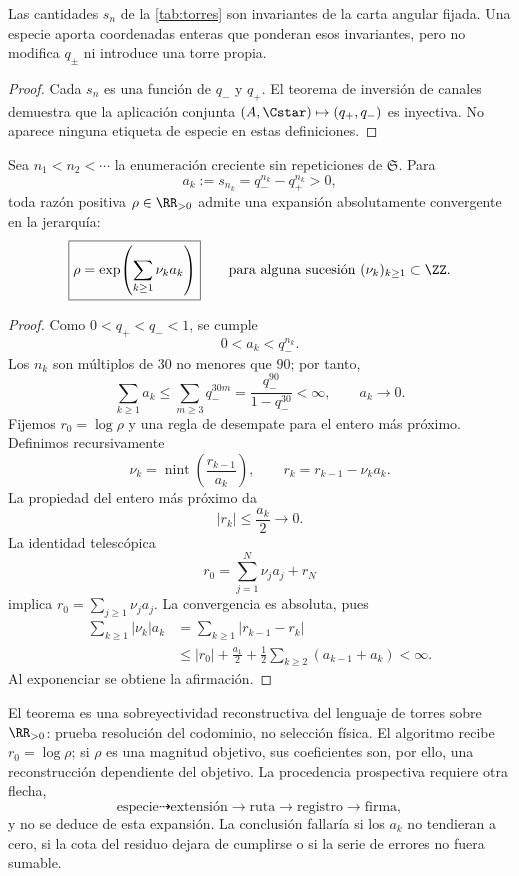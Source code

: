 \begin{proposition}
Las cantidades \(s_n\) de la \cref{tab:torres} son invariantes de la carta
angular fijada. Una especie aporta coordenadas enteras que ponderan esos
invariantes, pero no modifica \(q_\pm\) ni introduce una torre propia.
\end{proposition}
\begin{proof}
Cada \(s_n\) es una función de \(q_-\) y \(q_+\). El teorema de inversión de
canales demuestra que la aplicación conjunta
\((A,\Cstar)\mapsto(q_+,q_-)\) es inyectiva. No aparece ninguna etiqueta de
especie en estas definiciones.
\end{proof}

\begin{theorem}
\label{thm:completitud-reconstructiva-torres}
Sea \(n_1<n_2<\cdots\) la enumeración creciente sin repeticiones de
\(\mathfrak S\). Para
\[
 a_k:=s_{n_k}=q_-^{n_k}-q_+^{n_k}>0,
\]
toda razón positiva \(\rho\in\RR_{>0}\) admite una expansión absolutamente
convergente en la jerarquía:
\[
 \boxed{\rho=
 \exp\!\left(\sum_{k\geq1}\nu_k a_k\right)}
 \qquad\text{para alguna sucesión }(\nu_k)_{k\geq1}\subset\ZZ.
\]
\end{theorem}

\begin{proof}
Como \(0<q_+<q_-<1\), se cumple
\[
 0<a_k<q_-^{n_k}.
\]
Los \(n_k\) son múltiplos de \(30\) no menores que \(90\); por tanto,
\[
 \sum_{k\geq1}a_k
 \leq\sum_{m\geq3}q_-^{30m}
 =\frac{q_-^{90}}{1-q_-^{30}}<\infty,
 \qquad a_k\longrightarrow0.
\]
Fijemos \(r_0=\log\rho\) y una regla de desempate para el entero más próximo.
Definimos recursivamente
\[
 \nu_k=\operatorname{nint}\!\left(\frac{r_{k-1}}{a_k}\right),
 \qquad
 r_k=r_{k-1}-\nu_k a_k.
\]
La propiedad del entero más próximo da
\[
 |r_k|\leq\frac{a_k}{2}\longrightarrow0.
\]
La identidad telescópica
\[
 r_0=\sum_{j=1}^{N}\nu_j a_j+r_N
\]
implica \(r_0=\sum_{j\geq1}\nu_j a_j\). La convergencia es absoluta, pues
\[
 \begin{aligned}
 \sum_{k\geq1}|\nu_k|a_k
 &=\sum_{k\geq1}|r_{k-1}-r_k|\\
 &\leq |r_0|+\frac{a_1}{2}
 +\frac12\sum_{k\geq2}(a_{k-1}+a_k)<\infty.
 \end{aligned}
\]
Al exponenciar se obtiene la afirmación.
\end{proof}

\begin{remark}
El teorema es una sobreyectividad reconstructiva del lenguaje de torres sobre
\(\RR_{>0}\): prueba resolución del codominio, no selección física. El
algoritmo recibe \(r_0=\log\rho\); si \(\rho\) es una magnitud objetivo, sus
coeficientes son, por ello, una reconstrucción dependiente del objetivo. La
procedencia prospectiva requiere otra flecha,
\[
 \text{especie}\dashrightarrow\text{extensión}
 \longrightarrow\text{ruta}\longrightarrow\text{registro}
 \longrightarrow\text{firma},
\]
y no se deduce de esta expansión. La conclusión fallaría si los \(a_k\) no
tendieran a cero, si la cota del residuo dejara de cumplirse o si la serie de
errores no fuera sumable.
\end{remark}

